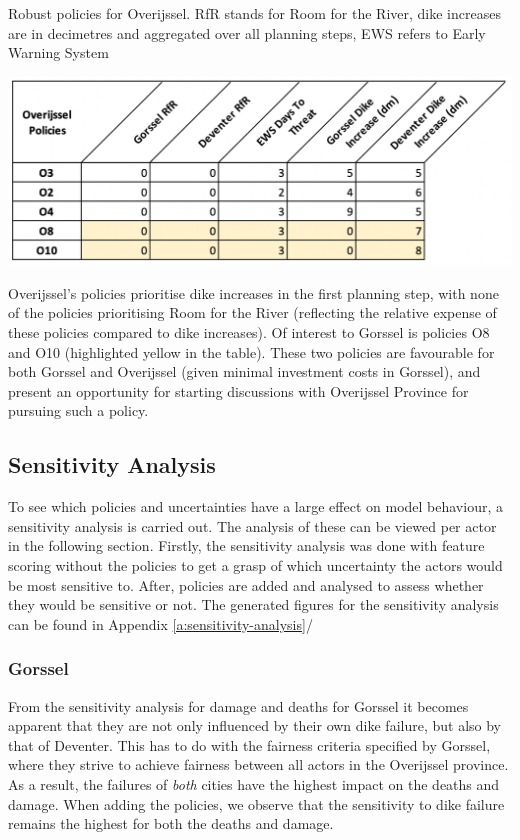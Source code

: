 \begin{table}[h!]
  \centering
  \captionsetup{justification=centering,margin=2cm}
  \caption{Robust policies for Overijssel. RfR stands for Room for the River, dike increases are in decimetres and aggregated over all planning steps, EWS refers to Early Warning System}
  \label{tab:opols}
  \includegraphics[width=0.8\linewidth]{report/figures/opols.png}
\end{table}

Overijssel's policies prioritise dike increases in the first planning step, with none of the policies prioritising Room for the River (reflecting the relative expense of these policies compared to dike increases). Of interest to Gorssel is policies O8 and O10 (highlighted yellow in the table). These two policies are favourable for both Gorssel and Overijssel (given minimal investment costs in Gorssel), and present an opportunity for starting discussions with Overijssel Province for pursuing such a policy.


\subsection{Sensitivity Analysis}

To see which policies and uncertainties have a large effect on model behaviour, a sensitivity analysis is carried out. The analysis of these can be viewed per actor in the following section. Firstly, the sensitivity analysis was done with feature scoring without the policies to get a grasp of which uncertainty the actors would be most sensitive to. After, policies are added and analysed to assess whether they would be sensitive or not. The generated figures for the sensitivity analysis can be found in Appendix \ref{a:sensitivity-analysis}/

\subsubsection{Gorssel}

From the sensitivity analysis for damage and deaths for Gorssel it becomes apparent that they are not only influenced by their own dike failure, but also by that of Deventer. This has to do with the fairness criteria specified by Gorssel, where they strive to achieve fairness between all actors in the Overijssel province. As a result, the failures of \textit{both} cities have the highest impact on the deaths and damage. When adding the policies, we observe that the sensitivity to dike failure remains the highest for both the deaths and damage. 

